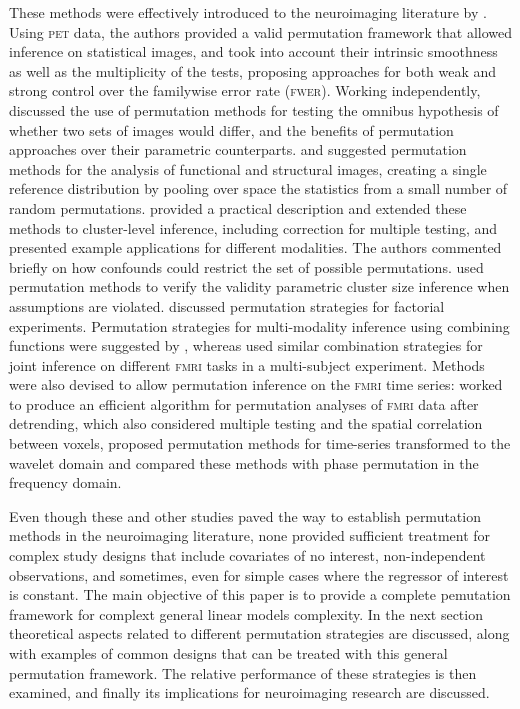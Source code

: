 These methods were effectively introduced to the neuroimaging literature by \citet{Holmes1996}. Using \textsc{pet} data, the authors provided a valid permutation framework that allowed inference on statistical images, and took into account their intrinsic smoothness as well as the multiplicity of the tests, proposing approaches for both weak and strong control over the familywise error rate (\textsc{fwer}). Working independently, \citet{Arndt1996} discussed the use of permutation methods for testing the omnibus hypothesis of whether two sets of images would differ, and the benefits of permutation approaches over their parametric counterparts. \citet{Bullmore1996, Bullmore1999} and \citet{Brammer1997} suggested permutation methods for the analysis of functional and structural images, creating a single reference distribution by pooling over space the statistics from a small number of random permutations. \citet{Nichols2002} provided a practical description and extended these methods to cluster-level inference, including correction for multiple testing, and presented example applications for different modalities. The authors commented briefly on how confounds could restrict the set of possible permutations. \citet{Hayasaka2003} used permutation methods to verify the validity parametric cluster size inference when assumptions are violated. \citet{Suckling2004} discussed permutation strategies for factorial experiments. Permutation strategies for multi-modality inference using combining functions were suggested by \citet{Hayasaka2006}, whereas \citet{Fehr2008} used similar combination strategies for joint inference on different \textsc{fmri} tasks in a multi-subject experiment. Methods were also devised to allow permutation inference on the \textsc{fmri} time series: \citet{Belmonte2001} worked to produce an efficient algorithm for permutation analyses of \textsc{fmri} data after detrending, which also considered multiple testing and the spatial correlation between voxels, \citet{Bullmore2001} proposed permutation methods for time-series transformed to the wavelet domain and \citet{Laird2004} compared these methods with phase permutation in the frequency domain.

Even though these and other studies paved the way to establish permutation methods in the neuroimaging literature, none provided sufficient treatment for complex study designs that include covariates of no interest, non-independent observations, and sometimes, even for simple cases where the regressor of interest is constant. The main objective of this paper is to provide a complete pemutation framework for complext general linear models complexity. In the next section theoretical aspects related to different permutation strategies are discussed, along with examples of common designs that can be treated with this general permutation framework. The relative performance of these strategies is then examined, and finally its implications for neuroimaging research are discussed.

